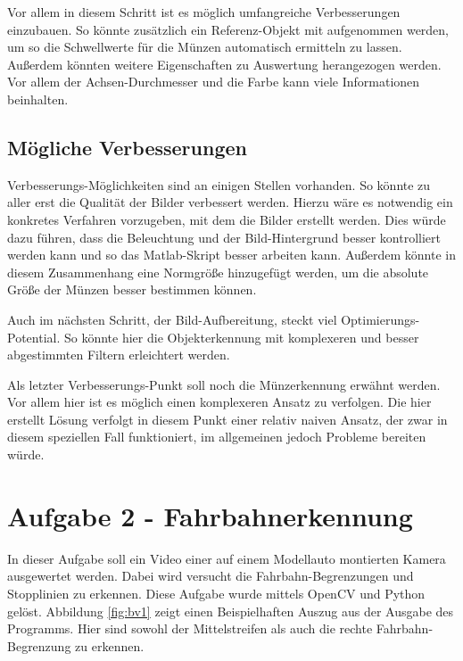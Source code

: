 \documentclass[a4paper,DIV=calc,ngerman]{scrartcl}
\begin{document}
Vor allem in diesem Schritt ist es möglich umfangreiche Verbesserungen einzubauen. So könnte zusätzlich ein Referenz-Objekt mit aufgenommen werden, um so die Schwellwerte für die Münzen automatisch ermitteln zu lassen. Außerdem könnten weitere Eigenschaften zu Auswertung herangezogen werden. Vor allem der Achsen-Durchmesser und die Farbe kann viele Informationen beinhalten.



\subsection{Mögliche Verbesserungen}
\label{sec:a1verbesserungen}
Verbesserungs-Möglichkeiten sind an einigen Stellen vorhanden. So könnte zu aller erst die Qualität der Bilder verbessert werden. Hierzu wäre es notwendig ein konkretes Verfahren vorzugeben, mit dem die Bilder erstellt werden. Dies würde dazu führen, dass die Beleuchtung und der Bild-Hintergrund besser kontrolliert werden kann und so das Matlab-Skript besser arbeiten kann. Außerdem könnte in diesem Zusammenhang eine Normgröße hinzugefügt werden, um die absolute Größe der Münzen besser bestimmen können.

Auch im nächsten Schritt, der Bild-Aufbereitung, steckt viel Optimierungs-Potential. So könnte hier die Objekterkennung mit komplexeren und besser abgestimmten Filtern erleichtert werden.

Als letzter Verbesserungs-Punkt soll noch die Münzerkennung erwähnt werden. Vor allem hier ist es möglich einen komplexeren Ansatz zu verfolgen. Die hier erstellt Lösung verfolgt in diesem Punkt einer relativ naiven Ansatz, der zwar in diesem speziellen Fall funktioniert, im allgemeinen jedoch Probleme bereiten würde. 






\lstset{language=python}
\section{Aufgabe 2 - Fahrbahnerkennung}
\label{sec:aufgabe2}
In dieser Aufgabe soll ein Video einer auf einem Modellauto montierten Kamera ausgewertet werden. Dabei wird versucht die Fahrbahn-Begrenzungen und Stopplinien zu erkennen. Diese Aufgabe wurde mittels OpenCV und Python gelöst. Abbildung \ref{fig:bv1} zeigt einen Beispielhaften Auszug aus der Ausgabe des Programms. Hier sind sowohl der Mittelstreifen als auch die rechte Fahrbahn-Begrenzung zu erkennen.
\end{document}
